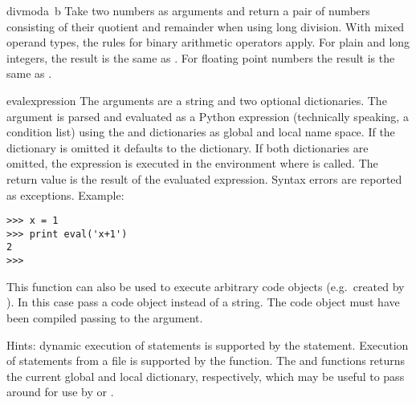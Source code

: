 \begin{funcdesc}{divmod}{a\, b}
  Take two numbers as arguments and return a pair of numbers consisting
  of their quotient and remainder when using long division.  With mixed
  operand types, the rules for binary arithmetic operators apply.  For
  plain and long integers, the result is the same as
  .
  For floating point numbers the result is the same as
  .
\end{funcdesc}

\begin{funcdesc}{eval}{expression}
  The arguments are a string and two optional dictionaries.  The
   argument is parsed and evaluated as a Python
  expression (technically speaking, a condition list) using the
   and  dictionaries as global and local name
  space.  If the  dictionary is omitted it defaults to
  the  dictionary.  If both dictionaries are omitted, the
  expression is executed in the environment where  is
  called.  The return value is the result of the evaluated expression.
  Syntax errors are reported as exceptions.  Example:

\bcode\begin{verbatim}
>>> x = 1
>>> print eval('x+1')
2
>>> 
\end{verbatim}\ecode
%
  This function can also be used to execute arbitrary code objects
  (e.g.\ created by ).  In this case pass a code
  object instead of a string.  The code object must have been compiled
  passing  to the  argument.

  Hints: dynamic execution of statements is supported by the
   statement.  Execution of statements from a file is
  supported by the  function.  The 
  and  functions returns the current global and local
  dictionary, respectively, which may be useful
  to pass around for use by  or .

\end{funcdesc}

